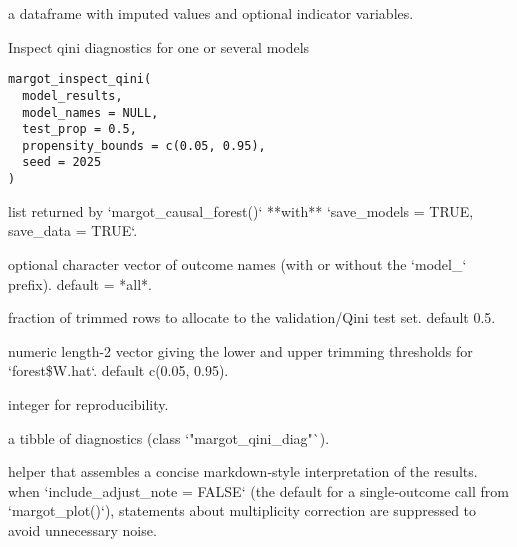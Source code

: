 \documentclass[a4paper]{book}
\begin{document}
%
\begin{Value}
a dataframe with imputed values and optional indicator variables.
\end{Value}
%
\begin{Description}
Inspect qini diagnostics for one or several models
\end{Description}
%
\begin{Usage}
\begin{verbatim}
margot_inspect_qini(
  model_results,
  model_names = NULL,
  test_prop = 0.5,
  propensity_bounds = c(0.05, 0.95),
  seed = 2025
)
\end{verbatim}
\end{Usage}
%
\begin{Arguments}
\begin{ldescription}
\item[\code{model\_results}] list returned by `margot\_causal\_forest()` **with**
`save\_models = TRUE, save\_data = TRUE`.

\item[\code{model\_names}] optional character vector of outcome names
(with or without the `model\_` prefix).  default = *all*.

\item[\code{test\_prop}] fraction of trimmed rows to allocate to the
validation/Qini test set.  default 0.5.

\item[\code{propensity\_bounds}] numeric length-2 vector giving the lower
and upper trimming thresholds for `forest\$W.hat`.  default
c(0.05, 0.95).

\item[\code{seed}] integer for reproducibility.
\end{ldescription}
\end{Arguments}
%
\begin{Value}
a tibble of diagnostics (class `"margot\_qini\_diag"`).
\end{Value}
%
\begin{Description}
helper that assembles a concise markdown‑style interpretation of the results.
when `include\_adjust\_note = FALSE` (the default for a single‑outcome call
from `margot\_plot()`), statements about multiplicity correction are
suppressed to avoid unnecessary noise.
\end{Description}
\end{document}
